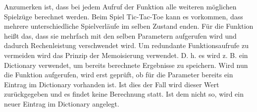 Anzumerken ist, dass bei jedem Aufruf der Funktion  alle weiteren möglichen Spielzüge berechnet werden. 
Beim Spiel Tic-Tac-Toe kann es vorkommen, dass mehrere unterschiedliche Spielverläufe im selben Zustand enden. 
Für die Funktion  heißt das, dass sie mehrfach mit den selben Parametern aufgerufen wird und dadurch 
Rechenleistung verschwendet wird. Um redundante Funktionsaufrufe zu vermeiden wird das Prinzip der Memoisierung 
verwendet. D. h. es wird z. B. ein Dictionary verwendet, um bereits berechnete Ergebnisse zu speichern. Wird nun 
die Funktion  aufgerufen, wird erst geprüft, ob für die Parameter bereits ein Eintrag im Dictionary 
vorhanden ist. Ist dies der Fall wird dieser Wert zurückgegeben und es findet keine Berechnung statt. Ist dem nicht 
so, wird ein neuer Eintrag im Dictionary angelegt.